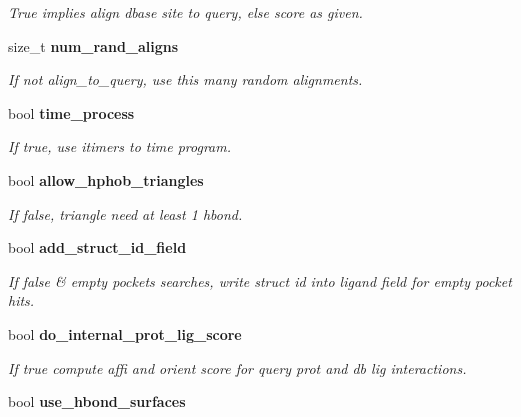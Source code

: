 \begin{CompactItemize}
\begin{CompactList}\small\item\em True implies align dbase site to query, else score as given. \item\end{CompactList}\item 
size\_\-t \bf{num\_\-rand\_\-aligns}\label{classASCbase_1_1SearchParameters_019cff6f0e6b9d6028f7e9fab62e62b6}

\begin{CompactList}\small\item\em If not align\_\-to\_\-query, use this many random alignments. \item\end{CompactList}\item 
bool \bf{time\_\-process}\label{classASCbase_1_1SearchParameters_7ed54b1f8513ddd3e56686c36fb0f89d}

\begin{CompactList}\small\item\em If true, use itimers to time program. \item\end{CompactList}\item 
bool \bf{allow\_\-hphob\_\-triangles}\label{classASCbase_1_1SearchParameters_a9d1bb630cda4fe759f4299354cef05f}

\begin{CompactList}\small\item\em If false, triangle need at least 1 hbond. \item\end{CompactList}\item 
bool \bf{add\_\-struct\_\-id\_\-field}\label{classASCbase_1_1SearchParameters_6dbd7bf284c1dbfd2c2af2becf89a078}

\begin{CompactList}\small\item\em If false \& empty pockets searches, write struct id into ligand field for empty pocket hits. \item\end{CompactList}\item 
bool \bf{do\_\-internal\_\-prot\_\-lig\_\-score}\label{classASCbase_1_1SearchParameters_96a5af359501d56a5670d49c32467994}

\begin{CompactList}\small\item\em If true compute affi and orient score for query prot and db lig interactions. \item\end{CompactList}\item 
bool \bf{use\_\-hbond\_\-surfaces}\label{classASCbase_1_1SearchParameters_1c517ad691e1606cce4cdfac986067b0}


\end{CompactItemize}
